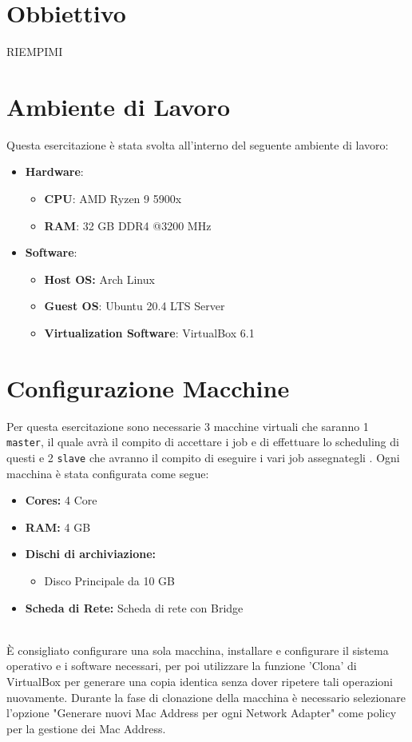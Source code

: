 \section{Obbiettivo}

RIEMPIMI

\section{Ambiente di Lavoro}

Questa esercitazione \`{e} stata svolta all'interno del seguente ambiente di lavoro:

\begin{itemize}
	\item \textbf{Hardware}: 
		\begin{itemize}
			\item \textbf{CPU}: AMD Ryzen 9 5900x
			\item \textbf{RAM}: 32 GB DDR4 @3200 MHz
		\end{itemize}
	\item \textbf{Software}:
		\begin{itemize}
			\item \textbf{Host OS:} Arch Linux
			\item \textbf{Guest OS}: Ubuntu 20.4 LTS Server
			\item \textbf{Virtualization Software}: VirtualBox 6.1
		\end{itemize}
\end{itemize}

\section{Configurazione Macchine}

Per questa esercitazione sono necessarie 3 macchine virtuali che saranno 1 \lstinline[style=cmd]|master|, il quale avr\`{a} il compito di accettare i job e di effettuare lo scheduling di questi e 2 \lstinline[style=cmd]|slave| che avranno il compito di eseguire i vari job assegnategli . Ogni macchina \`{e} stata configurata come segue:

\begin{itemize}
	\item \textbf{Cores:} 4 Core
	\item \textbf{RAM:} 4 GB
	\item \textbf{Dischi di archiviazione:}
		\begin{itemize}
			\item Disco Principale da 10 GB
		\end{itemize}
	\item \textbf{Scheda di Rete:} Scheda di rete con Bridge
\end{itemize}
\ \\
\`{E} consigliato configurare una sola macchina, installare e configurare il sistema operativo e i software necessari, per poi utilizzare la funzione 'Clona' di VirtualBox per generare una copia identica senza dover ripetere tali operazioni nuovamente. Durante la fase di clonazione della macchina \`{e} necessario selezionare l'opzione "Generare nuovi Mac Address per ogni Network Adapter" come policy per la gestione dei Mac Address.

